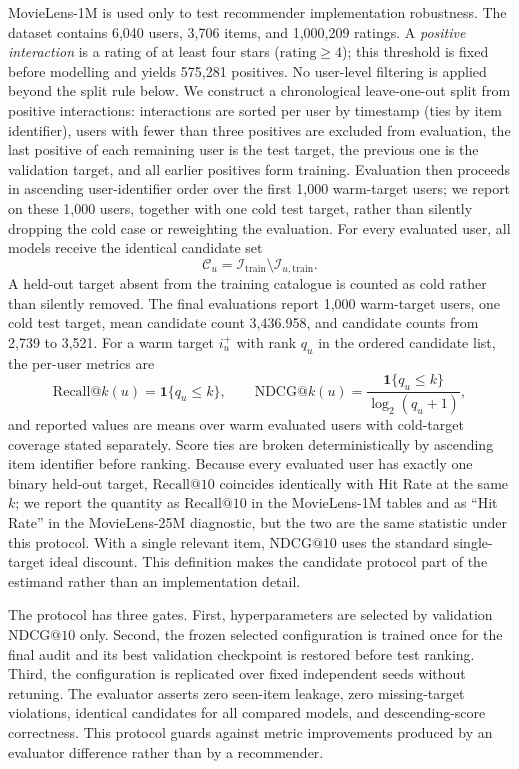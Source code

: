 \documentclass[pdflatex,sn-mathphys-num]{sn-jnl}
\makeatletter
\theoremstyle{thmstyleone}
\theoremstyle{thmstyletwo}
\theoremstyle{thmstylethree}
\newcommand{\NDCG}{\mathrm{NDCG@10}}
\newcommand{\Recall}{\mathrm{Recall@10}}
\makeatother
\begin{document}
MovieLens-1M is used only to test recommender implementation robustness. The dataset contains 6,040 users, 3,706 items, and 1,000,209 ratings. A \emph{positive interaction} is a rating of at least four stars ($\mathrm{rating}\geq4$); this threshold is fixed before modelling and yields 575,281 positives. No user-level filtering is applied beyond the split rule below. We construct a chronological leave-one-out split from positive interactions: interactions are sorted per user by timestamp (ties by item identifier), users with fewer than three positives are excluded from evaluation, the last positive of each remaining user is the test target, the previous one is the validation target, and all earlier positives form training. Evaluation then proceeds in ascending user-identifier order over the first 1,000 warm-target users; we report on these 1,000 users, together with one cold test target, rather than silently dropping the cold case or reweighting the evaluation. For every evaluated user, all models receive the identical candidate set
\begin{equation}
 \mathcal{C}_u=\mathcal{I}_{\mathrm{train}}\setminus\mathcal{I}_{u,\mathrm{train}}.
\label{eq:candidates}
\end{equation}
A held-out target absent from the training catalogue is counted as cold rather than silently removed. The final evaluations report 1,000 warm-target users, one cold test target, mean candidate count 3,436.958, and candidate counts from 2,739 to 3,521. For a warm target $i_u^+$ with rank $q_u$ in the ordered candidate list, the per-user metrics are
\begin{equation}
 \mathrm{Recall@}k(u)=\mathbf{1}\{q_u\leq k\},\qquad
 \mathrm{NDCG@}k(u)=\frac{\mathbf{1}\{q_u\leq k\}}{\log_2(q_u+1)},
\label{eq:ranking-metrics}
\end{equation}
and reported values are means over warm evaluated users with cold-target coverage stated separately. Score ties are broken deterministically by ascending item identifier before ranking. Because every evaluated user has exactly one binary held-out target, $\Recall$ coincides identically with Hit Rate at the same $k$; we report the quantity as $\Recall$ in the MovieLens-1M tables and as ``Hit Rate'' in the MovieLens-25M diagnostic, but the two are the same statistic under this protocol. With a single relevant item, $\NDCG$ uses the standard single-target ideal discount. This definition makes the candidate protocol part of the estimand rather than an implementation detail.

The protocol has three gates. First, hyperparameters are selected by validation $\NDCG$ only. Second, the frozen selected configuration is trained once for the final audit and its best validation checkpoint is restored before test ranking. Third, the configuration is replicated over fixed independent seeds without retuning. The evaluator asserts zero seen-item leakage, zero missing-target violations, identical candidates for all compared models, and descending-score correctness. This protocol guards against metric improvements produced by an evaluator difference rather than by a recommender.
\end{document}

